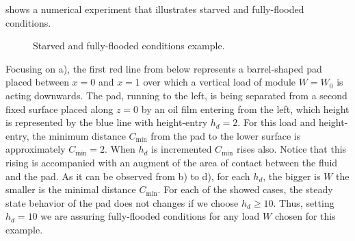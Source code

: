  shows a numerical experiment that illustrates starved and fully-flooded conditions. 
 \begin{figure}[ht!]
 \centering 
 \def\svgwidth{\textwidth}\small{
}
\caption{Starved and fully-flooded conditions example.}\label{fig:ex_starved_cond}
\end{figure}
Focusing on  a), the first red line from below represents a barrel-shaped pad placed between $x=0$ and $x=1$ over which a vertical load of module $W=W_0$ is acting downwards. The pad, running to the left, is being separated from a second fixed surface placed along $z=0$ by an oil film entering from the left, which height is represented by the blue line with height-entry $h_d=2$. For this load and height-entry, the minimum distance $C_\text{min}$ from the pad to the lower surface is approximately $C_\text{min}=2$. When $h_d$ is incremented $C_\text{min}$ rises also. Notice that this rising is accompanied with an augment of the area of contact between the fluid and the pad. As it can be observed from  b) to d), for each $h_d$, the bigger is $W$ the smaller is the minimal distance $C_\text{min}$. For each of the showed cases, the steady state behavior of the pad does not changes if we choose $h_d\geq 10$. Thus, setting $h_d=10$ we are assuring fully-flooded conditions for any load $W$ chosen for this example.

